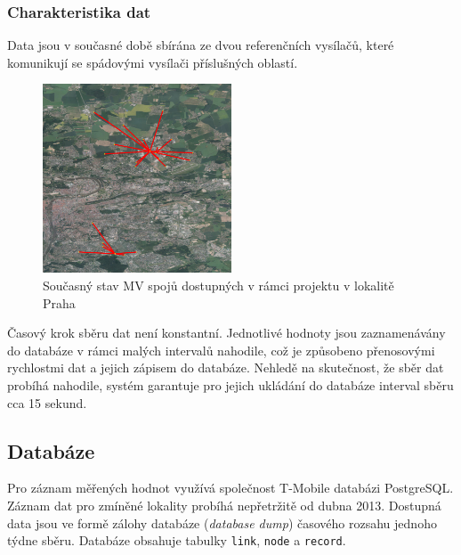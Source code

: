 \documentclass[a4paper,12pt,oneside]{report}
\begin{document}
\subsubsection*{Charakteristika dat} Data jsou v současné době
sbírána ze dvou referenčních vysílačů, které komunikují se spádovými
vysílači příslušných oblastí.

\begin{figure}[h!]
    \centering
    \includegraphics[width=0.5\textwidth]{./img/letnany.png}
    \caption[Snapshot model]{Současný stav MV spojů dostupných v rámci projektu v lokalitě Praha  \centering  }
        \label{fig:snapshot}
 \end{figure} 

 Časový krok sběru dat není konstantní. Jednotlivé hodnoty jsou
 zaznamenávány do databáze v rámci malých intervalů nahodile, což je
 způsobeno přenosovými rychlostmi dat a jejich zápisem do
 databáze. Nehledě na skutečnost, že sběr dat probíhá nahodile, systém
 garantuje pro jejich ukládání do databáze interval sběru cca 15
 sekund.

\subsection*{Databáze}  
Pro záznam měřených hodnot využívá společnost T-Mobile databázi
PostgreSQL. Záznam dat pro zmíněné lokality probíhá nepřetržitě od
dubna 2013. Dostupná data jsou ve formě zálohy databáze
(\textit{database dump}) časového rozsahu jednoho týdne
sběru. Databáze obsahuje tabulky \texttt{link}, \texttt{node} a
\texttt{record}.
 
\end{document}
